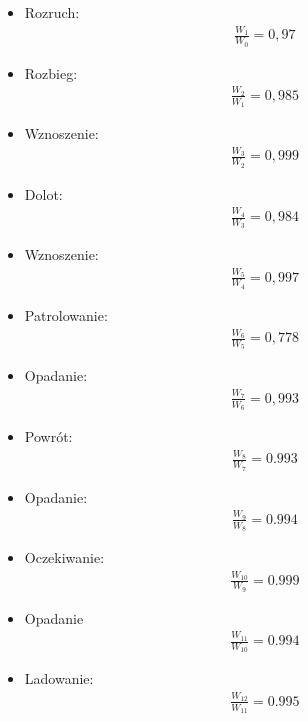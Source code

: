        \begin{itemize}
            \item Rozruch:
                \begin{align}
                    \frac{W_{1}}{W_{0}}=0,97
                \end{align}
            \item Rozbieg:
                \begin{align}
                    \frac{W_{2}}{W_{1}}=0,985
                \end{align}
            \item Wznoszenie:
                \begin{align}
                    \frac{W_{3}}{W_{2}}=0,999
                \end{align}           
            \item Dolot:
                \begin{align}
                    \frac{W_{4}}{W_{3}}=0,984
                \end{align} 
            \item Wznoszenie:
                \begin{align}
                    \frac{W_{5}}{W_{4}}=0,997
                \end{align}  
            \item Patrolowanie:
                \begin{align}
                    \frac{W_{6}}{W_{5}}=0,778
                \end{align}
            \item Opadanie:
                \begin{align}
                    \frac{W_{7}}{W_{6}}=0,993
                \end{align}  
            \item Powrót:
                \begin{align}
                    \frac{W_{8}}{W_{7}}=0.993
                \end{align}  
            \item Opadanie:
                \begin{align}
                    \frac{W_{9}}{W_{8}}=0.994
                \end{align}  
            \item Oczekiwanie:
                \begin{align}
                    \frac{W_{10}}{W_{9}}=0.999
                \end{align}  
            \item Opadanie
                \begin{align}
                    \frac{W_{11}}{W_{10}}=0.994
                \end{align}
            \item Ladowanie:
                \begin{align}
                    \frac{W_{12}}{W_{11}}= 0.995
                \end{align}
        \end{itemize}

